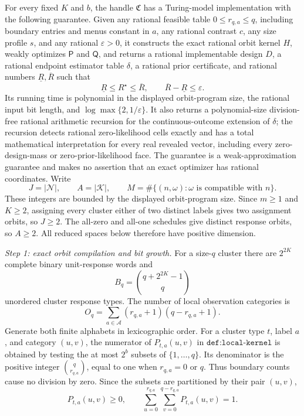 For every fixed \(K\) and \(b\), the handle \(\mathfrak C\) has a Turing-model implementation with the following guarantee. Given any rational feasible table \(0\le r_{q,a}\le q\), including boundary entries and menus constant in \(a\), any rational contrast \(c\), any size profile \(s\), and any rational \(\varepsilon>0\), it constructs the exact rational orbit kernel \(H\), weakly optimizes \(\mathsf P\) and \(\mathsf Q\), and returns a rational implementable design \(D\), a rational endpoint estimator table \(\delta\), a rational prior certificate, and rational numbers \(\underline R,\overline R\) such that
\[
 \underline R\le R^\star\le\overline R,
 \qquad \overline R-\underline R\le\varepsilon.
\]
Its running time is polynomial in the displayed orbit-program size, the rational input bit length, and \(\log\max\{2,1/\varepsilon\}\). It also returns a polynomial-size division-free rational arithmetic recursion for the continuous-outcome extension of \(\delta\); the recursion detects rational zero-likelihood cells exactly and has a total mathematical interpretation for every real revealed vector, including every zero-design-mass or zero-prior-likelihood face. The guarantee is a weak-approximation guarantee and makes no assertion that an exact optimizer has rational coordinates.
Write
\[
 J=|\mathcal N|,
 \qquad A=|\mathcal K|,
 \qquad
 M=\#\{(n,\omega):\omega\text{ is compatible with }n\}.
\tag{1}
\]
These integers are bounded by the displayed orbit-program size.  Since \(m\ge1\) and \(K\ge2\), assigning every cluster either of two distinct labels gives two assignment orbits, so \(J\ge2\).  The all-zero and all-one schedules give distinct response orbits, so \(A\ge2\).  All reduced spaces below therefore have positive dimension.

\emph{Step 1: exact orbit compilation and bit growth.}
For a size-\(q\) cluster there are \(2^{2K}\) complete binary unit-response words and
\[
 B_q=\binom{q+2^{2K}-1}{q}
\tag{2}
\]
unordered cluster response types.  The number of local observation categories is
\[
 O_q=\sum_{a\in\mathcal A}(r_{q,a}+1)(q-r_{q,a}+1).
\tag{3}
\]
Generate both finite alphabets in lexicographic order.  For a cluster type \(t\), label \(a\), and category \((u,v)\), the numerator of \(P_{t,a}(u,v)\) in \(\texttt{def:local-kernel}\) is obtained by testing the at most \(2^b\) subsets of \(\{1,\ldots,q\}\).  Its denominator is the positive integer \(\binom q{r_{q,a}}\), equal to one when \(r_{q,a}=0\) or \(q\).  Thus boundary counts cause no division by zero.  Since the subsets are partitioned by their pair \((u,v)\),
\[
 P_{t,a}(u,v)\ge0,
 \qquad
 \sum_{u=0}^{r_{q,a}}\sum_{v=0}^{q-r_{q,a}}P_{t,a}(u,v)=1.
\tag{4}
\]


